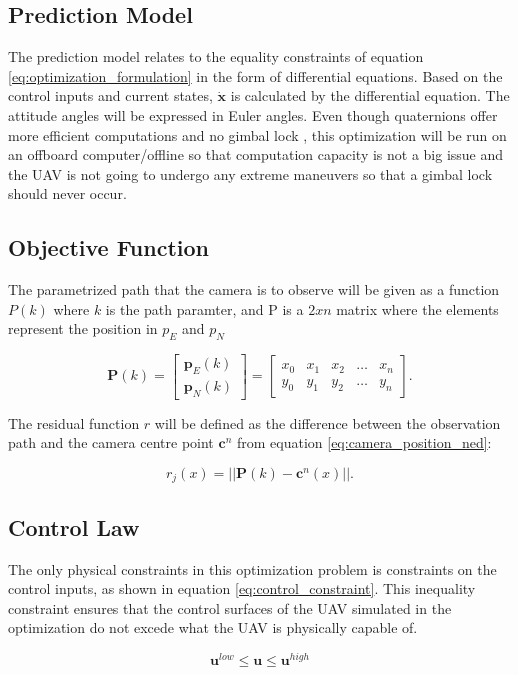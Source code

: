 \subsection{Prediction Model}

The prediction model relates to the equality constraints of equation \ref{eq:optimization_formulation} in the form of differential equations. Based on the control inputs and current states, $\mathbf{\dot{x}}$ is calculated by the differential equation. The attitude angles will be expressed in Euler angles. Even though quaternions offer more efficient computations and no gimbal lock \cite{uavBEARD}, this optimization will be run on an offboard computer/offline so that computation capacity is not a big issue and the UAV is not going to undergo any extreme maneuvers so that a gimbal lock should never occur.


\subsection{Objective Function}

The parametrized path that the camera is to observe will be given as a function $P(k)$ where $k$ is the path paramter, and P is a $2xn$ matrix where the elements represent the position in $p_E$ and $p_N$

\begin{equation}
	\mathbf{P}(k) = 
	\begin{bmatrix}
		\mathbf{p}_E(k) \\ \mathbf{p}_N(k)
	\end{bmatrix}
	=
	\begin{bmatrix}
		x_0 & x_1 & x_2 & \hdots & x_n \\
		y_0 & y_1 & y_2 & \hdots & y_n
	\end{bmatrix}.
\end{equation}

The residual function $r$ will be defined as the difference between the observation path and the camera centre point $\mathbf{c}^n$ from equation \ref{eq:camera_position_ned}:

\begin{equation}
	r_j(x) = ||\mathbf{P}(k) - \mathbf{c}^n(x)||.
\end{equation} 


\subsection{Control Law}

The only physical constraints in this optimization problem is constraints on the control inputs, as shown in equation \ref{eq:control_constraint}. This inequality constraint ensures that the control surfaces of the UAV simulated in the optimization do not excede what the UAV is physically capable of.

\begin{equation}
	\label{eq:control_constraint}
	\mathbf{u}^{low} \leq \mathbf{u} \leq \mathbf{u}^{high}
\end{equation}
